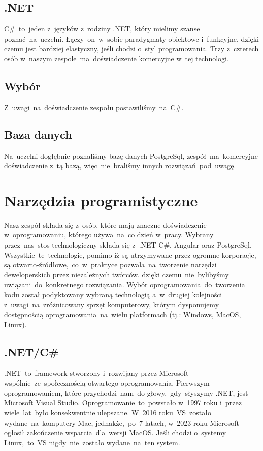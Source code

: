 \subsection{.NET}\label{subsec:.net}
C\#~to~jeden z~języków z~rodziny .NET, który mielimy szanse poznać~na~uczelni.
Łączy~on~w~sobie paradygmaty obiektowe i~funkcyjne, dzięki czemu jest bardziej elastyczny, jeśli chodzi o~styl programowania.
Trzy z~czterech osób w~naszym zespole~ma~doświadczenie komercyjne w~tej technologi.

\subsection{Wybór}\label{subsec:wybor}
Z~uwagi~na~doświadczenie zespołu postawiliśmy~na~C\#.

\subsection{Baza danych}\label{subsec:baza-danych}
Na~uczelni dogłębnie poznaliśmy bazę danych PostgreSql, zespół~ma~komercyjne doświadczenie z~tą bazą, więc~nie~braliśmy innych rozwiązań~pod~uwagę.

\section{Narzędzia programistyczne}
\label{sec:narzedzia-programistyczne}
Nasz zespół składa się z~osób, które mają znaczne doświadczenie w~oprogramowaniu, którego używa~na~co dzień w~pracy.
Wybrany przez~nas~stos technologiczny składa się z~.NET C\#, Angular oraz PostgreSql.
Wszystkie~te~technologie, pomimo iż są utrzymywane przez ogromne korporacje, są otwarto-źródłowe,~co~w~praktyce pozwala~na~tworzenie narzędzi deweloperskich przez niezależnych twórców, dzięki czemu~nie~bylibyśmy uwiązani~do~konkretnego rozwiązania.
Wybór oprogramowania~do~tworzenia kodu został podyktowany wybraną technologią a~w~drugiej kolejności z~uwagi~na~zróżnicowany sprzęt komputerowy, którym dysponujemy  dostępnością oprogramowania~na~wielu platformach (tj.: Windows, MacOS, Linux).

\subsection{.NET/C\#}\label{subsec:.net/c}
.NET~to~framework stworzony i~rozwijany przez Microsoft wspólnie~ze~społecznością otwartego oprogramowania.
Pierwszym oprogramowaniem, które przychodzi~nam~do głowy,~gdy~słyszymy .NET, jest Microsoft Visual Studio.
Oprogramowanie~to~powstało w~1997 roku i~przez wiele~lat~było konsekwentnie ulepszane.
W~2016 roku~VS~zostało wydane~na~komputery Mac, jednakże,~po~7 latach, w~2023 roku Microsoft ogłosił zakończenie wsparcia~dla~wersji MacOS.
Jeśli chodzi o~systemy Linux,~to~VS nigdy~nie~zostało wydane~na~ten system.

